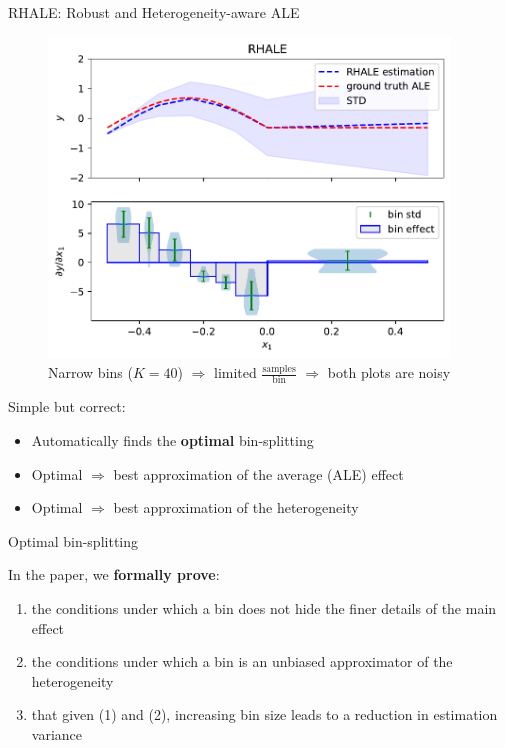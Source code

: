 \documentclass[final]{beamer}
\newlength{\colwidth}
\begin{document}
\begin{frame}[t]
\begin{columns}[t]
\begin{column}{\colwidth}
\begin{block}{RHALE: Robust and Heterogeneity-aware ALE}
    \begin{figure}
      \centering
      \includegraphics[width=0.95\textwidth]{./../code/concept_figure/exp_1_rhale_0.pdf}
      \caption{Narrow bins (\(K=40\)) \(\Rightarrow\) limited
        \(\frac{\text{samples}}{\text{bin}}\) \(\Rightarrow\) both plots are noisy }
      \label{fig:acc-1}
    \end{figure}

    \vspace{2mm}
    Simple but correct:
    \begin{itemize}
    \item Automatically finds the \textbf{optimal} bin-splitting
    \item Optimal $\Rightarrow$ best approximation of the average (ALE) effect
    \item Optimal $\Rightarrow$ best approximation of the heterogeneity 
    \end{itemize}
  \end{block}

      \begin{defbox}{Optimal bin-splitting}{}

        In the paper, we \textbf{formally prove}:  
        \begin{enumerate}
        \item the conditions under which a bin does not hide the finer details of the main effect
        \item the conditions under which a bin is an unbiased approximator of the heterogeneity

        \item that given (1) and (2), increasing bin size leads to a reduction in estimation variance
        \end{enumerate}


\end{defbox}
\end{column}
\end{columns}
\end{frame}
\end{document}
